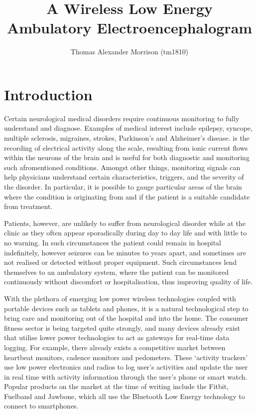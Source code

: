 \documentclass[]{article}
\title{A Wireless  Low Energy Ambulatory Electroencephalogram}
\author{Thomas Alexander Morrison (tm1810)}
\begin{document}
\maketitle

\clearpage

\clearpage

\section{Introduction}

Certain neurological medical disorders require continuous monitoring to fully understand and diagnose. Examples of medical interest include epilepsy, syncope, multiple sclerosis, migraines, strokes, Parkinson’s and Alzheimer’s disease.  is the recording of electrical activity along the scale, resulting from ionic current flows within the neurons of the brain and is useful for both diagnostic and monitoring such afromentioned conditions.  Amongst other things, monitoring  signals can help physicians understand certain characteristics, triggers, and the severity of the disorder. In particular, it is possible to gauge particular areas of the brain where the condition is originating from and if the patient is a suitable candidate from treatment. \


Patients, however, are unlikely to suffer from neurological disorder while at the clinic as they often appear sporadically during day to day life and with little to no warning. In such circumstances the patient could remain in hospital indefinitely, however seizures can be minutes to years apart, and sometimes are not realised or detected without proper equipment. Such circumstances lend themselves to an ambulatory system, where the patient can be monitored continuously without discomfort or hospitalisation, thus improving quality of life. 

With the plethora of emerging low power wireless technologies coupled with portable devices such as tablets and phones, it is a natural technological step to bring care and monitoring out of the hospital and into the home. The consumer fitness sector is being targeted quite strongly, and many devices already exist that utilise lower power technologies to act as gateways for real-time data logging. For example, there already exists a competitive market between heartbeat monitors, cadence monitors and pedometers. These ‘activity trackers’ use low power electronics and radios to log user’s activities and update the user in real time with activity information through the user’s phone or smart watch. Popular products on the market at the time of writing include the Fitbit, Fuelband and Jawbone, which all use the Bluetooth Low Energy technology to connect to smartphones.
\end{document}
